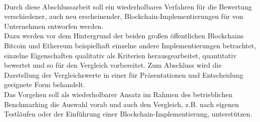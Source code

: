 
\hspace{1em}\,\vspace{3em}
\setcounter{page}{1}

Durch diese Abschlussarbeit soll ein wiederholbares Verfahren für die Bewertung verschiedener, auch neu erscheinender, Blockchain-Implementierungen für von Unternehmen entworfen werden. \\
Dazu werden vor dem Hintergrund der beiden großen öffentlichen Blockchains Bitcoin und Ethereum beispielhaft einzelne andere Implementierungen betrachtet, einzelne Eigenschaften qualitativ als Kriterien herausgearbeitet, quantitativ bewertet und so für den Vergleich vorbereitet. Zum Abschluss wird die Darstellung der Vergleichswerte in einer für Präsentationen und Entscheidung geeignete Form behandelt. \\
Das Vorgehen soll als wiederholbarer Ansatz im Rahmen des betrieblichen Benchmarking die Auswahl vorab und auch den Vergleich, z.B. nach eigenen Testläufen oder der Einführung einer Blockchain-Implementierung, unterstützen.

